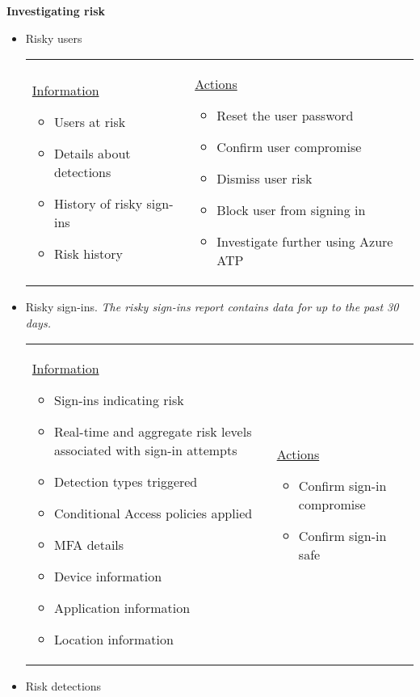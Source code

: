 \textbf{Investigating risk}
\begin{itemize}
\item Risky users \\
	\begin{tabular}{p{7cm}p{7cm}}
	\underline{Information}
		\begin{itemize}
		\item Users at risk
		\item Details about detections
		\item History of risky sign-ins
		\item Risk history
		\end{itemize} &
	\underline{Actions}
		\begin{itemize}
		\item Reset the user password
		\item Confirm user compromise
		\item Dismiss user risk
		\item Block user from signing in
		\item Investigate further using Azure ATP
		\end{itemize}
	\end{tabular}	
\item Risky sign-ins. \textit{The risky sign-ins report contains data for up to the past 30 days.} \\
	\begin{tabular}{p{7cm}p{7cm}}
	\underline{Information}
		\begin{itemize}
		\item Sign-ins indicating risk
		\item Real-time and aggregate risk levels associated with sign-in attempts
		\item Detection types triggered
		\item Conditional Access policies applied
		\item MFA details
		\item Device information
		\item Application information
		\item Location information
		\end{itemize} &
	\underline{Actions}
		\begin{itemize}
		\item Confirm sign-in compromise
		\item Confirm sign-in safe
		\end{itemize}
	\end{tabular}
\item Risk detections \\

\end{itemize}
